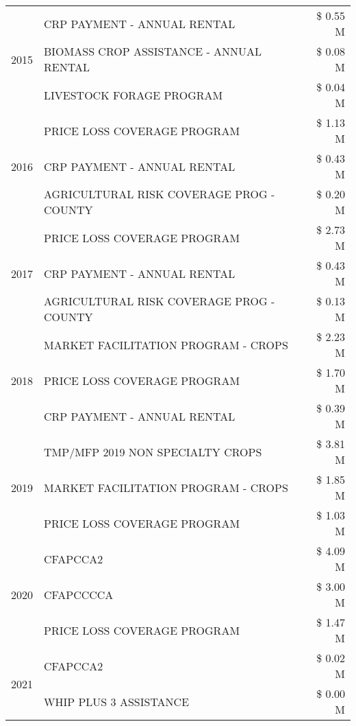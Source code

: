 \begin{tabular}{llr}
\cline{1-3}
\multirow[t]{3}{*}{2015} & CRP PAYMENT - ANNUAL RENTAL & \$ 0.55 M \\
 & BIOMASS CROP ASSISTANCE - ANNUAL RENTAL & \$ 0.08 M \\
 & LIVESTOCK FORAGE PROGRAM & \$ 0.04 M \\
\cline{1-3}
\multirow[t]{3}{*}{2016} & PRICE LOSS COVERAGE PROGRAM & \$ 1.13 M \\
 & CRP PAYMENT - ANNUAL RENTAL & \$ 0.43 M \\
 & AGRICULTURAL RISK COVERAGE PROG - COUNTY & \$ 0.20 M \\
\cline{1-3}
\multirow[t]{3}{*}{2017} & PRICE LOSS COVERAGE PROGRAM & \$ 2.73 M \\
 & CRP PAYMENT - ANNUAL RENTAL & \$ 0.43 M \\
 & AGRICULTURAL RISK COVERAGE PROG - COUNTY & \$ 0.13 M \\
\cline{1-3}
\multirow[t]{3}{*}{2018} & MARKET FACILITATION PROGRAM - CROPS & \$ 2.23 M \\
 & PRICE LOSS COVERAGE PROGRAM & \$ 1.70 M \\
 & CRP PAYMENT - ANNUAL RENTAL & \$ 0.39 M \\
\cline{1-3}
\multirow[t]{3}{*}{2019} & TMP/MFP 2019 NON SPECIALTY CROPS & \$ 3.81 M \\
 & MARKET FACILITATION PROGRAM - CROPS & \$ 1.85 M \\
 & PRICE LOSS COVERAGE PROGRAM & \$ 1.03 M \\
\cline{1-3}
\multirow[t]{3}{*}{2020} & CFAPCCA2 & \$ 4.09 M \\
 & CFAPCCCCA & \$ 3.00 M \\
 & PRICE LOSS COVERAGE PROGRAM & \$ 1.47 M \\
\cline{1-3}
\multirow[t]{2}{*}{2021} & CFAPCCA2 & \$ 0.02 M \\
 & WHIP PLUS 3 ASSISTANCE & \$ 0.00 M \\
\cline{1-3}
\bottomrule
\end{tabular}
